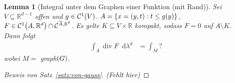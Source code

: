 \documentclass[11pt, twoside, a4paper]{article}
\theoremstyle{plain}
\newtheorem{lemma}[blockelement]{Lemma}
\numberwithin{equation}{subsection}
\newcommand{\set}[1]{\left\{#1\right\}}
\newcommand{\pair}[1]{\left(#1\right)}
\newcommand{\of}[1]{\mathopen{}\mathclose{}\bgroup\left(#1\aftergroup\egroup\right)}
\newcommand{\dif}{\mathop{}\!\mathrm{d}}
\DeclareMathOperator{\fdiv}{div}
\newcommand{\R}{\mathbb{R}}
\newcommand{\mC}{\mathcal{C}}
\begin{document}
    \begin{lemma}[Integral unter dem Graphen einer Funktion (mit Rand)]
        Sei $V\subseteq\R^{d-1}$ offen und $g\in\mC^{1}\of{V}$. $A=\set{x=\pair{y,t}: t\leq g\of{y}}$, $F\in\mC^{1}\of{A, \R^{d}}\cap\mC^{\overline{A}, \R^d}$. Es gelte $K \subseteq V \times \R$ kompakt, sodass $F = 0$ auf $A \setminus K$. Dann folgt
        \begin{align*}
            \int_{A}^{} \fdiv F \dif \lambda^d &= \int_{M}^{} ?
        \end{align*}
        wobei $M = $ graph$\of{G}$.
    \end{lemma}

    \begin{proof}[Beweis von Satz~\ref{satz:von-gauss}]
        \textit{(Fehlt hier)}
    \end{proof}
\end{document}
